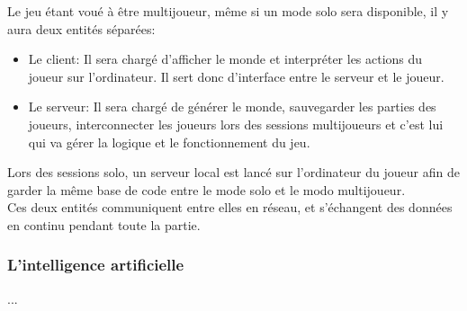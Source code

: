 \documentclass{article}
\begin{document}
Le jeu étant voué à être multijoueur, même si un mode solo sera disponible, il y aura deux entités séparées:

\begin{itemize}
    \item Le client:  Il sera chargé d'afficher le monde et interpréter les actions du joueur sur l'ordinateur. Il sert donc d'interface entre le serveur et le joueur.
    
    \item Le serveur: Il sera chargé de générer le monde, sauvegarder les parties des joueurs, interconnecter les joueurs lors des sessions multijoueurs et c'est lui qui va gérer la logique et le fonctionnement du jeu.
\end{itemize}

Lors des sessions solo, un serveur local est lancé sur l'ordinateur du joueur afin de garder la même base de code entre le mode solo et le modo multijoueur. \\
Ces deux entités communiquent entre elles en réseau, et s'échangent des données en continu pendant toute la partie.

\subsubsection{L'intelligence artificielle}

...
\end{document}
